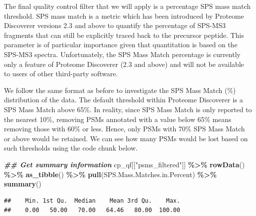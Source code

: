 \documentclass[9pt,a4paper,]{extarticle}
\newenvironment{Shaded}{\begin{snugshade}}{\end{snugshade}}
\newcommand{\DocumentationTok}[1]{\textcolor[rgb]{0.56,0.35,0.01}{\textbf{\textit{#1}}}}
\newcommand{\FunctionTok}[1]{\textcolor[rgb]{0.13,0.29,0.53}{\textbf{#1}}}
\newcommand{\NormalTok}[1]{#1}
\newcommand{\SpecialCharTok}[1]{\textcolor[rgb]{0.81,0.36,0.00}{\textbf{#1}}}
\newcommand{\StringTok}[1]{\textcolor[rgb]{0.31,0.60,0.02}{#1}}
\begin{document}
The final quality control filter that we will apply is a percentage SPS mass
match threshold. SPS mass match is a metric which has been introduced by
Proteome Discoverer versions 2.3 and above to quantify the percentage of SPS-MS3
fragments that can still be explicitly traced back to the precursor peptide.
This parameter is of particular importance given that quantitation is based on
the SPS-MS3 spectra. Unfortunately, the SPS Mass Match percentage is currently
only a feature of Proteome Discoverer (2.3 and above) and will not be available
to users of other third-party software.

We follow the same format as before to investigate the SPS Mass Match (\%)
distribution of the data. The default threshold within Proteome Discoverer is a
SPS Mass Match above 65\%. In reality, since SPS Mass Match is only reported to
the nearest 10\%, removing PSMs annotated with a value below 65\% means removing
those with 60\% or less. Hence, only PSMs with 70\% SPS Mass Match or above would
be retained. We can see how many PSMs would be lost based on such thresholds
using the code chunk below.

\begin{Shaded}
\begin{Highlighting}[]
\DocumentationTok{\#\# Get summary information}
\NormalTok{cp\_qf[[}\StringTok{"psms\_filtered"}\NormalTok{]] }\SpecialCharTok{\%\textgreater{}\%} 
  \FunctionTok{rowData}\NormalTok{() }\SpecialCharTok{\%\textgreater{}\%} 
  \FunctionTok{as\_tibble}\NormalTok{() }\SpecialCharTok{\%\textgreater{}\%} 
  \FunctionTok{pull}\NormalTok{(SPS.Mass.Matches.in.Percent) }\SpecialCharTok{\%\textgreater{}\%} 
  \FunctionTok{summary}\NormalTok{()}
\end{Highlighting}
\end{Shaded}

\begin{verbatim}
##    Min. 1st Qu.  Median    Mean 3rd Qu.    Max. 
##    0.00   50.00   70.00   64.46   80.00  100.00
\end{verbatim}
\end{document}
